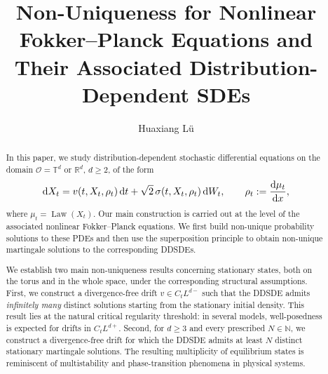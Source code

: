 \documentclass[UTF-8,reqno]{amsart}
\numberwithin{equation}{section}
\theoremstyle{definition}
\def\geq{\geqslant}
\def\geq{\geqslant}
\begin{document}
\title[Non-uniqueness  for  nFPEs and DDSDEs  ]{
Non-Uniqueness for Nonlinear Fokker--Planck Equations and Their Associated Distribution-Dependent SDEs}

\author{Huaxiang L\"u}
\address[H. L\"u]{Academy of Mathematics and Systems Science, Chinese Academy of Sciences, Beijing 100190, China, and  Fakult\"at f\"ur Mathematik, Bielefeld Universit\"at, D 33615 Bielefeld, Germany}

 

\begin{abstract}

In this paper, we study distribution-dependent stochastic differential
equations on the domain $\mathcal O=\mathbb T^d$ or $\mathbb R^d$,
$d\geq 2$, of the form
\begin{align*}
{\rm d}X_t
=
v(t,X_t,\rho_t)\,{\rm d}t
+
\sqrt{2}\,
\sigma(t,X_t,\rho_t)\,{\rm d}W_t,
\qquad
\rho_t:=\frac{{\rm d}\mu_t}{{\rm d}x},
\end{align*}
where $\mu_t=\operatorname{Law}(X_t)$.  
Our main construction is carried out at the level of the associated nonlinear
Fokker--Planck equations. We first build non-unique probability solutions to
these PDEs  and then use the superposition principle to
obtain non-unique martingale solutions to the corresponding DDSDEs.
 

We establish two main non-uniqueness results concerning stationary states,
both on the torus and in the whole space, under the corresponding structural
assumptions.  First, we
construct a   divergence-free drift
$v\in C_tL^{d-}$ such that the DDSDE admits \emph{infinitely many} distinct
  solutions starting from the  stationary initial density. This
result lies at the natural critical regularity threshold: in several models, well-posedness is expected for drifts in $C_tL^{d+}$.
Second, for $d\geq 3$ and every prescribed $N\in\mathbb{N}$, we construct a
 divergence-free drift for which the DDSDE admits at least
$N$ distinct stationary martingale solutions. The resulting multiplicity of
equilibrium states is reminiscent of multistability and phase-transition
phenomena in physical systems.
\end{abstract}
 
\end{document}
